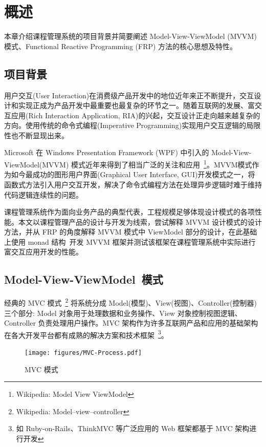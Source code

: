 \chapter{概述}

本章介绍课程管理系统的项目背景并简要阐述 Model-View-ViewModel (MVVM) 模式、Functional Reactive Programming (FRP) 方法的核心思想及特性。

\section{项目背景}

用户交互(User Interaction)在消费级产品开发中的地位近年来正不断提升，交互设计和实现正成为产品开发中最重要也最复杂的环节之一。随着互联网的发展、富交互应用(Rich Interaction Application, RIA)的兴起，交互设计正走向越来越复杂的方向。使用传统的命令式编程(Imperative Programming)实现用户交互逻辑的局限性也不断显现出来。

Microsoft 在 Windows Presentation Framework (WPF) 中引入的 Model-View-ViewModel(MVVM) 模式近年来得到了相当广泛的关注和应用~\footnote{Wikipedia: Model View ViewModel}。MVVM模式作为如今最成功的图形用户界面(Graphical User Interface, GUI)开发模式之一，将函数式方法引入用户交互开发，解决了命令式编程方法在处理异步逻辑时难于维持代码逻辑连续性的问题。

课程管理系统作为面向业务产品的典型代表，工程规模足够体现设计模式的各项性能。本文以课程管理产品的设计与开发为线索，尝试解释 MVVM 设计模式的设计方法，并从 FRP 的角度解释 MVVM 模式中 ViewModel 部分的设计，在此基础上使用 monad 结构~\cite{raey}开发 MVVM 框架并测试该框架在课程管理系统中实际进行富交互应用开发的性能。

\section{Model-View-ViewModel~模式}

经典的 MVC 模式~\footnote{Wikipedia: Model–view–controller} 将系统分成 Model(模型)、View(视图)、Controller(控制器) 三个部分: Model 对象用于处理数据和业务操作、View 对象控制视图逻辑、Controller 负责处理用户操作。MVC 架构作为许多互联网产品和应用的基础架构在各大开发平台都有成熟的解决方案和技术框架~\footnote{如 Ruby-on-Rails、ThinkMVC 等广泛应用的 Web 框架都基于 MVC 架构进行开发}。

\begin{figure}[!h]
\begin{center}
\texttt{[image: figures/MVC-Process.pdf]}
\caption{MVC 模式\label{MVCOverview}}
\end{center}
\end{figure}

